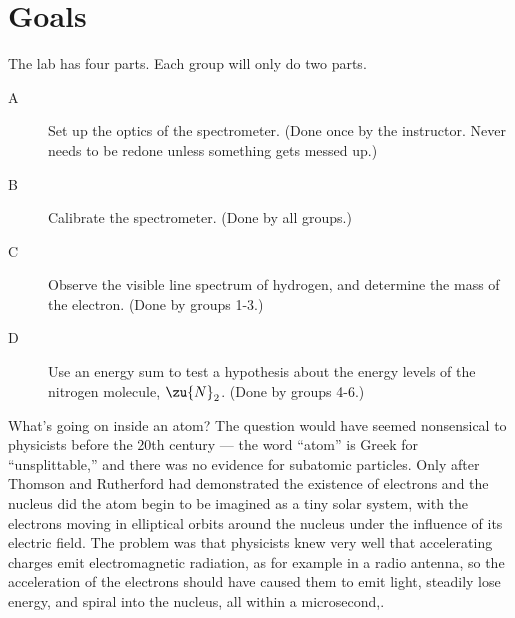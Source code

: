 \label{lab:hydrogen}

\apparatus
{}

\section*{Goals}

The lab has four parts. Each group will only do two parts.

\begin{description}

\item[A] Set up the optics of the spectrometer. (Done once by the instructor. Never needs to be redone unless
           something gets messed up.)

\item[B] Calibrate the spectrometer. (Done by all groups.)

\item[C] Observe the visible line spectrum of hydrogen, and determine the mass of the electron.
             (Done by groups 1-3.)

\item[D] Use an energy sum to test a hypothesis about the energy levels of the nitrogen molecule, $\zu{N}_2$.
             (Done by groups 4-6.)
\end{description}

\introduction

What's going on inside an atom? The question would have
seemed nonsensical to physicists before the 20th century ---
the word ``atom'' is Greek for ``unsplittable,'' and there
was no evidence for subatomic particles. Only after Thomson
and Rutherford had demonstrated the existence of electrons
and the nucleus did the atom begin to be imagined as a tiny
solar system, with the electrons moving in elliptical orbits
around the nucleus under the influence of its electric
field. The problem was that physicists knew very well that
accelerating charges emit electromagnetic radiation, as for
example in a radio antenna, so the acceleration of the
electrons should have caused them to emit light, steadily
lose energy, and spiral into the nucleus, all within a microsecond,.

